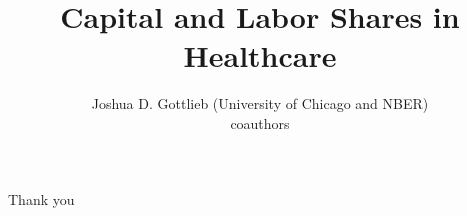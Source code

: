 \documentclass[11pt,notes=hide,aspectratio=169,mathserif]{beamer}
\title[Capital Share]{Capital and Labor Shares in Healthcare}
\author[Gottlieb \& friends ]{Joshua D. Gottlieb (University of Chicago and NBER) \\ coauthors}
\date{\monthname[\the\month] \the\year}
\begin{document}
\begin{frame}[plain]
\titlepage
\note{
	\begin{itemize}
	\end{itemize}
}
\end{frame}



\begin{frame}[plain]
\begin{center}{\LARGE Thank you}\end{center}
\end{frame}


\appendix
%


\end{document}
